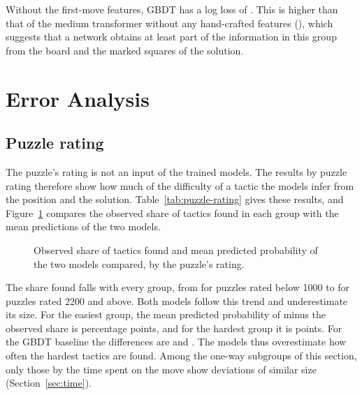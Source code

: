 \documentclass[11pt]{article}
\begin{document}
Without the first-move features, GBDT has a log loss of
. This is higher than that of the medium
transformer without any hand-crafted features
(), which suggests that a network obtains at
least part of the information in this group from the board and the marked
squares of the solution.
\fi
\fi

\section{Error Analysis}
\label{sec:error}



\iflook
\subsection{Puzzle rating}

The puzzle's rating is not an input of the trained models. The results by
puzzle rating therefore show how much of the difficulty of a tactic the
models infer from the position and the solution. Table~\ref{tab:puzzle-rating}
gives these results, and Figure~\ref{fig:puzzle-rating} compares the observed
share of tactics found in each group with the mean predictions of the two
models.

\begin{table}[htbp]\centering\footnotesize
{}
\caption{Test-set results by the puzzle's rating. For each group: the number
of test positions, the observed share of tactics found, the mean predicted
probability and log loss of each of the two models, and the paired gain of
the first model over the second.}
\label{tab:puzzle-rating}
\end{table}

\begin{figure}[htbp]\centering
{}
\caption{Observed share of tactics found and mean predicted probability of
the two models compared, by the puzzle's rating.}
\label{fig:puzzle-rating}
\end{figure}

The share found falls with every group, from
 for puzzles rated below 1000 to
 for puzzles rated 2200 and above. Both
models follow this trend and underestimate its size. For the easiest group,
the mean predicted probability of  minus the observed
share is  percentage points, and
for the hardest group it is 
points. For the GBDT baseline the differences are
 and
. The models thus overestimate
how often the hardest tactics are found. Among the one-way subgroups of this
section, only those by the time spent on the move show deviations of similar
size (Section~\ref{sec:time}).
\end{document}
